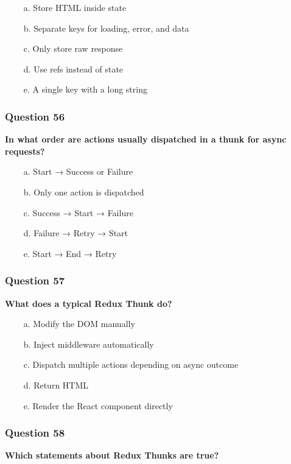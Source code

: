 \documentclass{article}
\newcommand{\cmark}{\textcolor{green}{\ding{51}}} %
\newcommand{\xmark}{\textcolor{red}{\ding{55}}}   %
\begin{document}
\begin{itemize}
  \item[\xmark\ a.] Store HTML inside state
  \item[\cmark\ b.] Separate keys for loading, error, and data
  \item[\xmark\ c.] Only store raw response
  \item[\xmark\ d.] Use refs instead of state
  \item[\xmark\ e.] A single key with a long string
\end{itemize}

\subsubsection*{Question 56}
\textbf{In what order are actions usually dispatched in a thunk for async requests?}

\begin{itemize}
  \item[\cmark\ a.] Start → Success or Failure
  \item[\xmark\ b.] Only one action is dispatched
  \item[\xmark\ c.] Success → Start → Failure
  \item[\xmark\ d.] Failure → Retry → Start
  \item[\xmark\ e.] Start → End → Retry
\end{itemize}

\subsubsection*{Question 57}
\textbf{What does a typical Redux Thunk do?}

\begin{itemize}
  \item[\xmark\ a.] Modify the DOM manually
  \item[\xmark\ b.] Inject middleware automatically
  \item[\cmark\ c.] Dispatch multiple actions depending on async outcome
  \item[\xmark\ d.] Return HTML
  \item[\xmark\ e.] Render the React component directly
\end{itemize}

\subsubsection*{Question 58}
\textbf{Which statements about Redux Thunks are true?}
\end{document}
